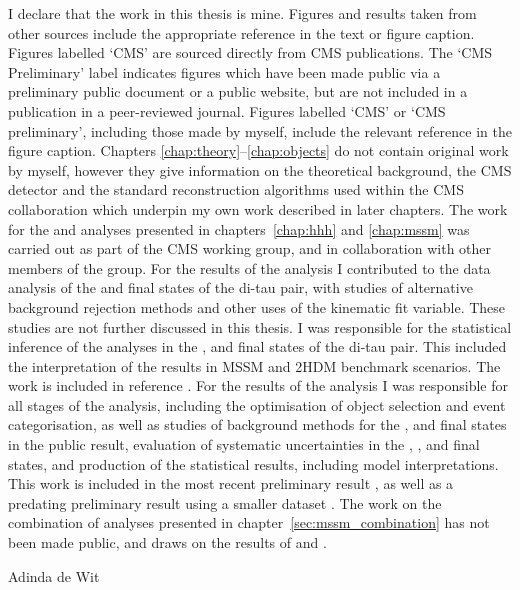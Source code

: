 \begin{declaration}
\small
  I declare that the work in this thesis is mine. Figures and results taken from other sources
include the appropriate reference in the text or figure caption. Figures labelled `CMS' are sourced
directly from CMS publications. The `CMS Preliminary' label indicates figures which
have been made public via a preliminary public document or a public website, but are not
included in a publication in a peer-reviewed journal. Figures labelled `CMS' or `CMS preliminary', 
including those made by myself, include the relevant reference in the figure caption.
Chapters \ref{chap:theory}--\ref{chap:objects} do not contain original work by myself, however they 
give information on the theoretical background, the CMS detector and the standard reconstruction algorithms
used within the CMS collaboration which underpin my own work described in later chapters.
The work for the \Htohhtobbtautau and \AHtotautau analyses presented in chapters~\ref{chap:hhh} and \ref{chap:mssm} was 
carried out as part of the CMS \Htotautau working group, and in collaboration with other members of the group.
For the results of the \Htohhtobbtautau analysis I contributed to the data analysis of the \etau and \mutau
final states of the di-tau pair, with studies of alternative \ttbar background rejection methods and
other uses of the kinematic fit variable. These studies are not further discussed in this thesis. I 
was responsible for the statistical inference of the analyses in the \etau, \mutau and \tautau final states
of the di-tau pair. This included
the interpretation of the results in MSSM and 2HDM benchmark scenarios. The 
work is included in reference \cite{CMS-HIG-14-034}. For the results of the \AHtotautau analysis
I was responsible for all stages of the analysis, including the optimisation
of object selection and event categorisation, as well as studies of background
methods for the \etau, \mutau and \tautau final states in the public result,
evaluation of systematic uncertainties in the \etau, \mutau, \tautau and \emu final states, and production of the statistical
results, including model interpretations. This work is included in the most recent
preliminary result \cite{CMS-PAS-HIG-16-037}, as well as a predating preliminary
result using a smaller dataset \cite{CMS-PAS-HIG-16-006}.
The work on the combination of \AHtotautau analyses presented in chapter~\ref{sec:mssm_combination} has
not been made public, and draws on the results of \cite{CMS-PAS-HIG-16-037} and \cite{CMS-PAS-HIG-16-006}.
\enlargethispage{2\baselineskip}

  \begin{flushright}
  Adinda de Wit
  \end{flushright}
\end{declaration}


